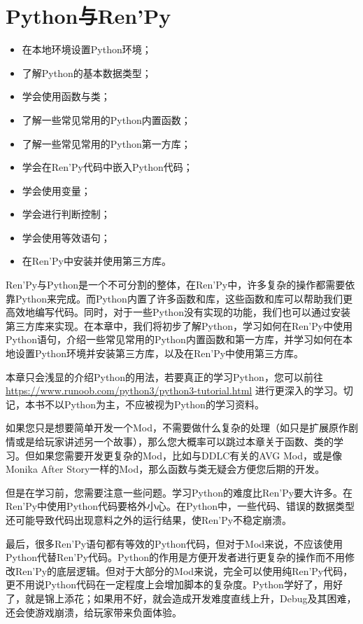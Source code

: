 \documentclass[../../Main.tex]{subfiles}
\begin{document}
\chapter{Python与Ren'Py}
\begin{ChapterGoals}
    \begin{itemize}
        \item 在本地环境设置Python环境；
        \item 了解Python的基本数据类型；
        \item 学会使用函数与类；
        \item 了解一些常见常用的Python内置函数；
        \item 了解一些常见常用的Python第一方库；
        \item 学会在Ren'Py代码中嵌入Python代码；
        \item 学会使用变量；
        \item 学会进行判断控制；
        \item 学会使用等效语句；
        \item 在Ren'Py中安装并使用第三方库。
    \end{itemize}
\end{ChapterGoals}

Ren'Py与Python是一个不可分割的整体，在Ren'Py中，许多复杂的操作都需要依靠Python来完成。而Python内置了许多函数和库，这些函数和库可以帮助我们更高效地编写代码。同时，对于一些Python没有实现的功能，我们也可以通过安装第三方库来实现。在本章中，我们将初步了解Python，学习如何在Ren'Py中使用Python语句，介绍一些常见常用的Python内置函数和第一方库，并学习如何在本地设置Python环境并安装第三方库，以及在Ren'Py中使用第三方库。

\begin{Attention}
    本章只会浅显的介绍Python的用法，若要真正的学习Python，您可以前往 \url{https://www.runoob.com/python3/python3-tutorial.html} 进行更深入的学习。切记，本书不以Python为主，不应被视为Python的学习资料。
\end{Attention}

\begin{Warning}
    如果您只是想要简单开发一个Mod，不需要做什么复杂的处理（如只是扩展原作剧情或是给玩家讲述另一个故事），那么您大概率可以跳过本章关于函数、类的学习。但如果您需要开发更复杂的Mod，比如与DDLC有关的AVG Mod，或是像Monika After Story一样的Mod，那么函数与类无疑会方便您后期的开发。

    但是在学习前，您需要注意一些问题。学习Python的难度比Ren'Py要大许多。在Ren'Py中使用Python代码要格外小心。在Python中，一些代码、错误的数据类型还可能导致代码出现意料之外的运行结果，使Ren'Py不稳定崩溃。

    最后，很多Ren'Py语句都有等效的Python代码，但对于Mod来说，不应该使用Python代替Ren'Py代码。Python的作用是方便开发者进行更复杂的操作而不用修改Ren'Py的底层逻辑。但对于大部分的Mod来说，完全可以使用纯Ren'Py代码，更不用说Python代码在一定程度上会增加脚本的复杂度。Python学好了，用好了，就是锦上添花；如果用不好，就会造成开发难度直线上升，Debug及其困难，还会使游戏崩溃，给玩家带来负面体验。
\end{Warning}









\end{document}
